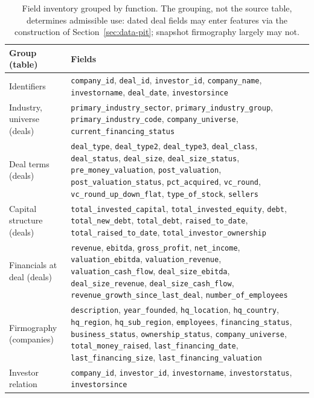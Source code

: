 \begin{table}[htbp]
\centering
\small
\begin{tabular}{lp{9.6cm}}
\toprule
Group (table) & Fields \\
\midrule
Identifiers &
\texttt{company\_id}, \texttt{deal\_id}, \texttt{investor\_id},
\texttt{company\_name}, \texttt{investorname}, \texttt{deal\_date},
\texttt{investorsince} \\
Industry, universe (deals) &
\texttt{primary\_industry\_sector}, \texttt{primary\_industry\_group},
\texttt{primary\_industry\_code}, \texttt{company\_universe},
\texttt{current\_financing\_status} \\
Deal terms (deals) &
\texttt{deal\_type}, \texttt{deal\_type2}, \texttt{deal\_type3}, \texttt{deal\_class},
\texttt{deal\_status}, \texttt{deal\_size}, \texttt{deal\_size\_status},
\texttt{pre\_money\_valuation}, \texttt{post\_valuation},
\texttt{post\_valuation\_status}, \texttt{pct\_acquired}, \texttt{vc\_round},
\texttt{vc\_round\_up\_down\_flat}, \texttt{type\_of\_stock}, \texttt{sellers} \\
Capital structure (deals) &
\texttt{total\_invested\_capital}, \texttt{total\_invested\_equity}, \texttt{debt},
\texttt{total\_new\_debt}, \texttt{total\_debt}, \texttt{raised\_to\_date},
\texttt{total\_raised\_to\_date}, \texttt{total\_investor\_ownership} \\
Financials at deal (deals) &
\texttt{revenue}, \texttt{ebitda}, \texttt{gross\_profit}, \texttt{net\_income},
\texttt{valuation\_ebitda}, \texttt{valuation\_revenue}, \texttt{valuation\_cash\_flow},
\texttt{deal\_size\_ebitda}, \texttt{deal\_size\_revenue},
\texttt{deal\_size\_cash\_flow}, \texttt{revenue\_growth\_since\_last\_deal},
\texttt{number\_of\_employees} \\
Firmography (companies) &
\texttt{description}, \texttt{year\_founded}, \texttt{hq\_location},
\texttt{hq\_country}, \texttt{hq\_region}, \texttt{hq\_sub\_region},
\texttt{employees}, \texttt{financing\_status}, \texttt{business\_status},
\texttt{ownership\_status}, \texttt{company\_universe},
\texttt{total\_money\_raised}, \texttt{last\_financing\_date},
\texttt{last\_financing\_size}, \texttt{last\_financing\_valuation} \\
Investor relation &
\texttt{company\_id}, \texttt{investor\_id}, \texttt{investorname},
\texttt{investorstatus}, \texttt{investorsince} \\
\bottomrule
\end{tabular}
\caption{Field inventory grouped by function. The grouping, not the source table,
determines admissible use: dated deal fields may enter features via the construction of
Section~\ref{sec:data-pit}; snapshot firmography largely may not.}
\label{tab:data-fields}
\end{table}

